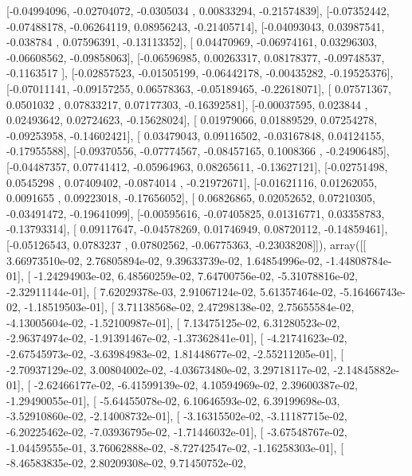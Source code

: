 \documentclass{article}
\begin{document}
       [-0.04994096, -0.02704072, -0.0305034 ,  0.00833294, -0.21574839],
       [-0.07352442, -0.07488178, -0.06264119,  0.08956243, -0.21405714],
       [-0.04093043,  0.03987541, -0.038784  ,  0.07596391, -0.13113352],
       [ 0.04470969, -0.06974161,  0.03296303, -0.06608562, -0.09858063],
       [-0.06596985,  0.00263317,  0.08178377, -0.09748537, -0.1163517 ],
       [-0.02857523, -0.01505199, -0.06442178, -0.00435282, -0.19525376],
       [-0.07011141, -0.09157255,  0.06578363, -0.05189465, -0.22618071],
       [ 0.07571367,  0.0501032 ,  0.07833217,  0.07177303, -0.16392581],
       [-0.00037595,  0.023844  ,  0.02493642,  0.02724623, -0.15628024],
       [ 0.01979066,  0.01889529,  0.07254278, -0.09253958, -0.14602421],
       [ 0.03479043,  0.09116502, -0.03167848,  0.04124155, -0.17955588],
       [-0.09370556, -0.07774567, -0.08457165,  0.1008366 , -0.24906485],
       [-0.04487357,  0.07741412, -0.05964963,  0.08265611, -0.13627121],
       [-0.02751498,  0.0545298 ,  0.07409402, -0.0874014 , -0.21972671],
       [-0.01621116,  0.01262055,  0.0091655 ,  0.09223018, -0.17656052],
       [ 0.06826865,  0.02052652,  0.07210305, -0.03491472, -0.19641099],
       [-0.00595616, -0.07405825,  0.01316771,  0.03358783, -0.13793314],
       [ 0.09117647, -0.04578269,  0.01746949,  0.08720112, -0.14859461],
       [-0.05126543,  0.0783237 ,  0.07802562, -0.06775363, -0.23038208]]), array([[  3.66973510e-02,   2.76805894e-02,   9.39633739e-02,
          1.64854996e-02,  -1.44808784e-01],
       [ -1.24294903e-02,   6.48560259e-02,   7.64700756e-02,
         -5.31078816e-02,  -2.32911144e-01],
       [  7.62029378e-03,   2.91067124e-02,   5.61357464e-02,
         -5.16466743e-02,  -1.18519503e-01],
       [  3.71138568e-02,   2.47298138e-02,   2.75655584e-02,
         -4.13005604e-02,  -1.52100987e-01],
       [  7.13475125e-02,   6.31280523e-02,  -2.96374974e-02,
         -1.91391467e-02,  -1.37362841e-01],
       [ -4.21741623e-02,  -2.67545973e-02,  -3.63984983e-02,
          1.81448677e-02,  -2.55211205e-01],
       [ -2.70937129e-02,   3.00804002e-02,  -4.03673480e-02,
          3.29718117e-02,  -2.14845882e-01],
       [ -2.62466177e-02,  -6.41599139e-02,   4.10594969e-02,
          2.39600387e-02,  -1.29490055e-01],
       [ -5.64455078e-02,   6.10646593e-02,   6.39199698e-03,
         -3.52910860e-02,  -2.14008732e-01],
       [ -3.16315502e-02,  -3.11187715e-02,  -6.20225462e-02,
         -7.03936795e-02,  -1.71446032e-01],
       [ -3.67548767e-02,  -1.04459555e-01,   3.76062888e-02,
         -8.72742547e-02,  -1.16258303e-01],
       [ -8.46583835e-02,   2.80209308e-02,   9.71450752e-02,
\end{document}
